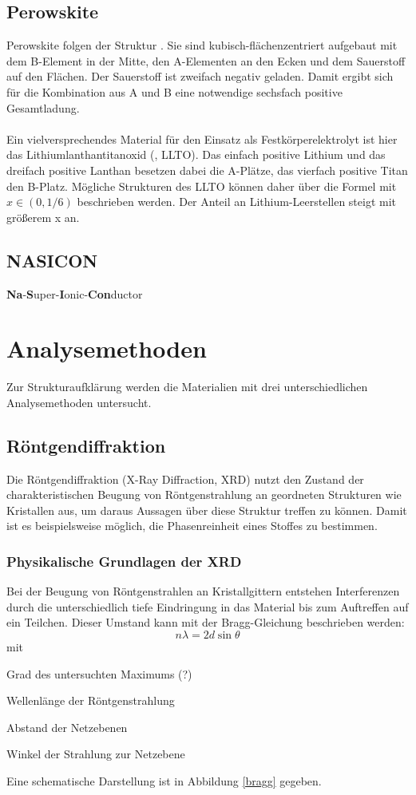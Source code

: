 \documentclass[a4paper, 11pt, headsepline,footsepline,twoside,abstract]{scrbook}
\begin{document}
\subsection{Perowskite}
Perowskite folgen der Struktur . Sie sind kubisch-flächenzentriert aufgebaut mit dem B-Element in der Mitte, den A-Elementen an den Ecken und dem Sauerstoff auf den Flächen. Der Sauerstoff ist zweifach negativ geladen. Damit ergibt sich für die Kombination aus A und B eine notwendige sechsfach positive Gesamtladung. %
\\\\
Ein vielversprechendes Material für den Einsatz als Festkörperelektrolyt ist hier das Lithiumlanthantitanoxid (, LLTO). Das einfach positive Lithium und das dreifach positive Lanthan besetzen dabei die A-Plätze, das vierfach positive Titan den B-Platz. Mögliche Strukturen des LLTO können daher über die Formel  mit $x \in (0, 1/6)$ beschrieben werden. Der Anteil an Lithium-Leerstellen steigt mit größerem x an.
\subsection{NASICON}
\textbf{Na}-\textbf{S}uper-\textbf{I}onic-\textbf{Con}ductor
\section{Analysemethoden}
Zur Strukturaufklärung werden die Materialien mit drei unterschiedlichen Analysemethoden untersucht.
\subsection{Röntgendiffraktion}
Die Röntgendiffraktion (X-Ray Diffraction, XRD) nutzt den Zustand der charakteristischen Beugung von Röntgenstrahlung an geordneten Strukturen wie Kristallen aus, um daraus Aussagen über diese Struktur treffen zu können. Damit ist es beispielsweise möglich, die Phasenreinheit eines Stoffes zu bestimmen.
\subsubsection{Physikalische Grundlagen der XRD}
Bei der Beugung von Röntgenstrahlen an Kristallgittern entstehen Interferenzen durch die unterschiedlich tiefe Eindringung in das Material bis zum Auftreffen auf ein Teilchen. Dieser Umstand kann mit der Bragg-Gleichung beschrieben werden:
\begin{equation}
n\lambda = 2d \sin{\theta}
\end{equation}
mit
\begin{description}\itemsep0pt
\item[n] Grad des untersuchten Maximums (?)
\item[$\lambda$] Wellenlänge der Röntgenstrahlung
\item[d] Abstand der Netzebenen
\item[$\theta$] Winkel der Strahlung zur Netzebene
\end{description}
Eine schematische Darstellung ist in Abbildung \ref{bragg} gegeben.
\end{document}
